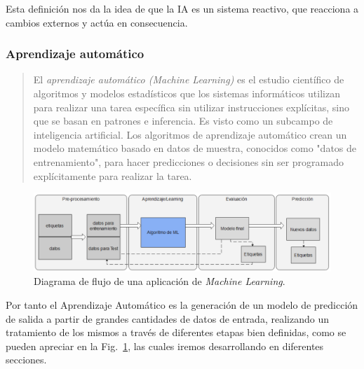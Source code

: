\documentclass[a4paper,12pt]{article}
\begin{document}
Esta definición nos da la idea de que la IA es un sistema reactivo, que reacciona a cambios externos y actúa en consecuencia.

\subsubsection{Aprendizaje automático} \label{machinelearning}

\begin{quote}
  El \textit{aprendizaje automático (Machine Learning)} es el estudio científico de algoritmos y modelos estadísticos que los sistemas informáticos utilizan para realizar una tarea específica sin utilizar instrucciones explícitas, sino que se basan en patrones e inferencia. Es visto como un subcampo de inteligencia artificial. Los algoritmos de aprendizaje automático crean un modelo matemático basado en datos de muestra, conocidos como "datos de entrenamiento", para hacer predicciones o decisiones sin ser programado explícitamente para realizar la tarea.
  
  \hfill \citet{bishop2006pattern}
\end{quote}


\begin{figure}[H]
	\begin{center}				
	\includegraphics[width=1\textwidth]{tesis_1.png}
  	\caption{Diagrama de flujo de una aplicación de \textit{Machine Learning}.}
  	\label{fig:flowchartml.}
  	\end{center}
\end{figure}

Por tanto el Aprendizaje Automático es la generación de un modelo de predicción de salida a partir de grandes cantidades de datos de entrada, realizando un tratamiento de los mismos a través de diferentes etapas bien definidas, como se pueden apreciar en la Fig.~\ref{fig:flowchartml.}, las cuales iremos desarrollando en diferentes secciones.
\end{document}
